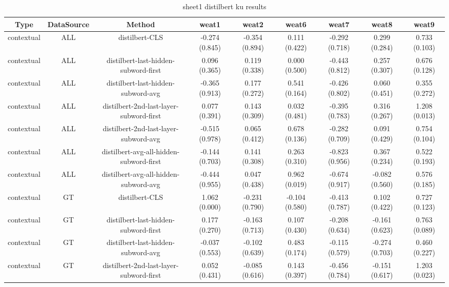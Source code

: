 \begin{sidewaystable}[htb]
    \centering
    \caption{sheet1 distilbert ku results}
    \label{appendix_tab:sheet1_distilbert_ku_results}
    \small
    \begin{tabular}{@{}ccccccccc@{}}
        \toprule
        Type & DataSource & Method & weat1 & weat2 & weat6 & weat7 & weat8 & weat9 \\
        \midrule
        contextual & ALL & distilbert-CLS & -0.274 (0.845) & -0.354 (0.894) & 0.111 (0.422) & -0.292 (0.718) & 0.299 (0.284) & 0.733 (0.103) \\
        contextual & ALL & distilbert-last-hidden-subword-first & 0.096 (0.365) & 0.119 (0.338) & 0.000 (0.500) & -0.443 (0.812) & 0.257 (0.307) & 0.676 (0.128) \\
        contextual & ALL & distilbert-last-hidden-subword-avg & -0.365 (0.913) & 0.177 (0.272) & 0.541 (0.164) & -0.426 (0.802) & 0.060 (0.451) & 0.355 (0.272) \\
        contextual & ALL & distilbert-2nd-last-layer-subword-first & 0.077 (0.391) & 0.143 (0.309) & 0.032 (0.481) & -0.395 (0.783) & 0.316 (0.267) & 1.208 (0.013) \\
        contextual & ALL & distilbert-2nd-last-layer-subword-avg & -0.515 (0.978) & 0.065 (0.412) & 0.678 (0.136) & -0.282 (0.709) & 0.091 (0.429) & 0.754 (0.104) \\
        contextual & ALL & distilbert-avg-all-hidden-subword-first & -0.144 (0.703) & 0.141 (0.308) & 0.263 (0.310) & -0.823 (0.956) & 0.367 (0.234) & 0.522 (0.193) \\
        contextual & ALL & distilbert-avg-all-hidden-subword-avg & -0.444 (0.955) & 0.047 (0.438) & 0.962 (0.019) & -0.674 (0.917) & -0.082 (0.560) & 0.576 (0.185) \\
        contextual & GT & distilbert-CLS & 1.062 (0.000) & -0.231 (0.790) & -0.104 (0.580) & -0.413 (0.787) & 0.102 (0.422) & 0.727 (0.123) \\
        contextual & GT & distilbert-last-hidden-subword-first & 0.177 (0.270) & -0.163 (0.713) & 0.107 (0.430) & -0.208 (0.634) & -0.161 (0.623) & 0.763 (0.089) \\
        contextual & GT & distilbert-last-hidden-subword-avg & -0.037 (0.553) & -0.102 (0.639) & 0.483 (0.174) & -0.115 (0.579) & -0.274 (0.703) & 0.460 (0.227) \\
        contextual & GT & distilbert-2nd-last-layer-subword-first & 0.052 (0.431) & -0.085 (0.616) & 0.143 (0.397) & -0.456 (0.784) & -0.151 (0.617) & 1.203 (0.023) \\

\end{tabular}
\end{sidewaystable}
